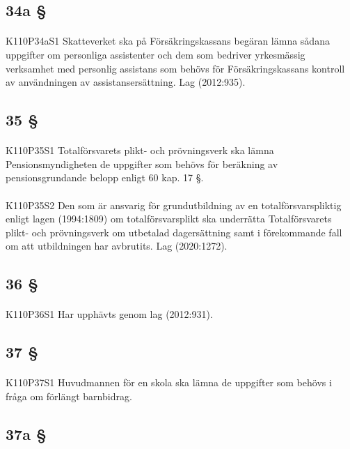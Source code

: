 \documentclass[a4paper,notitlepage,openany,10pt]{book}
\begin{document}
\subsection*{34a §}
\paragraph*{}
{\tiny K110P34aS1}
Skatteverket ska på Försäkringskassans begäran lämna sådana uppgifter om personliga assistenter och dem som bedriver yrkesmässig verksamhet med personlig assistans som behövs för Försäkringskassans kontroll av användningen av assistansersättning.
Lag (2012:935).
\subsection*{35 §}
\paragraph*{}
{\tiny K110P35S1}
Totalförsvarets plikt- och prövningsverk ska lämna Pensionsmyndigheten de uppgifter som behövs för beräkning av pensionsgrundande belopp enligt 60 kap. 17 §.
\paragraph*{}
{\tiny K110P35S2}
Den som är ansvarig för grundutbildning av en totalförsvarspliktig enligt lagen (1994:1809) om totalförsvarsplikt ska underrätta Totalförsvarets plikt- och prövningsverk om utbetalad dagersättning samt i förekommande fall om att utbildningen har avbrutits.
Lag (2020:1272).
\subsection*{36 §}
\paragraph*{}
{\tiny K110P36S1}
Har upphävts genom
lag (2012:931).
\subsection*{37 §}
\paragraph*{}
{\tiny K110P37S1}
Huvudmannen för en skola ska lämna de uppgifter som behövs i fråga om förlängt barnbidrag.
\subsection*{37a §}
\end{document}
